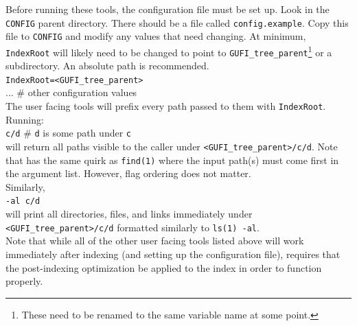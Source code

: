 Before running these tools, the configuration file must be set
up. Look in the \texttt{CONFIG} parent directory. There should be a
file called \texttt{config.example}. Copy this file to \texttt{CONFIG}
and modify any values that need changing. At minimum,
\texttt{IndexRoot} will likely need to be changed to point to
\texttt{GUFI\_tree\_parent}\footnote{These need to be renamed to the
same variable name at some point.} or a subdirectory. An absolute path
is recommended. \\

\indent \texttt{IndexRoot=<GUFI\_tree\_parent>} \\
\indent ... \# other configuration values \\

The user facing tools will prefix every path passed to them with
\texttt{IndexRoot}. \\

\noindent Running: \\

\indent \gufifind \texttt{c/d} \hfill \# \texttt{d} is some path under
\texttt{c} \\

will return all paths visible to the caller under
\texttt{<GUFI\_tree\_parent>/c/d}. Note that \gufifind has the same
quirk as \texttt{find(1)} where the input path(s) must come first in
the argument list. However, flag ordering does not matter. \\

Similarly, \\

\gufils \texttt{-al c/d} \\

will print all directories, files, and links immediately under
\texttt{<GUFI\_tree\_parent>/c/d} formatted similarly to
\texttt{ls(1)~-al}. \\

Note that while all of the other user facing tools listed above will
work immediately after indexing (and setting up the configuration
file), \gufidu requires that the post-indexing optimization
\gufitreesummaryall be applied to the index in order to function
properly.
\label{sec:gufi_du_treesummary}
